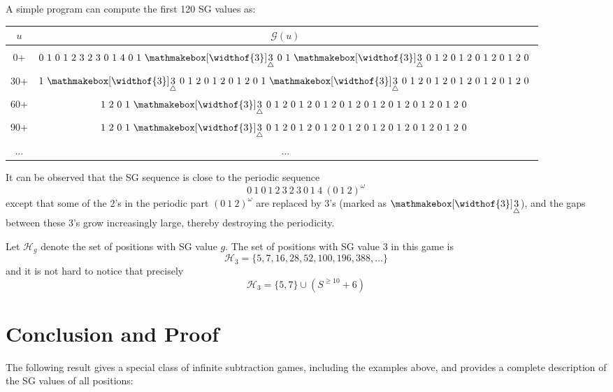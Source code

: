\documentclass[11pt]{article}
\theoremstyle{definition}
\theoremstyle{plain}
\newcommand{\E}{\mathmakebox[\widthof{3}]{\underset{\triangle}{3}}}
\begin{document}
A simple program can compute the first 120 SG values as:
\begin{center}
    \begin{tabular}{|c|c|}
        \hline
        $u$ & $\mathcal{G}(u)$ \\
        \hline
         & \\[-8pt]
        0+  & $0~ 1~ 0~ 1~ 2~ 3~ 2~ 3~ 0~ 1~ 4~ 0~ 1~\E~ 0~ 1~\E~ 0~ 1~ 2~ 0~ 1~ 2~ 0~ 1~ 2~ 0~ 1~ 2~ 0~$ \\[8pt]
        30+ & $1~\E~ 0~ 1~ 2~ 0~ 1~ 2~ 0~ 1~ 2~ 0~ 1~\E~ 0~ 1~ 2~ 0~ 1~ 2~ 0~ 1~ 2~ 0~ 1~ 2~ 0~ 1~ 2~ 0~$ \\[8pt]
        60+ & $1~ 2~ 0~ 1~\E~ 0~ 1~ 2~ 0~ 1~ 2~ 0~ 1~ 2~ 0~ 1~ 2~ 0~ 1~ 2~ 0~ 1~ 2~ 0~ 1~ 2~ 0~ 1~ 2~ 0~$ \\[8pt]
        90+ & $1~ 2~ 0~ 1~\E~ 0~ 1~ 2~ 0~ 1~ 2~ 0~ 1~ 2~ 0~ 1~ 2~ 0~ 1~ 2~ 0~ 1~ 2~ 0~ 1~ 2~ 0~ 1~ 2~ 0~$ \\[8pt]
        $\ldots$ & $\ldots$ \\
        \hline
    \end{tabular}
\end{center}

It can be observed that the SG sequence is close to the periodic sequence
\[
    0~ 1~ 0~ 1~ 2~ 3~ 2~ 3~ 0~ 1~ 4~ (0~ 1~ 2)^{\omega}
\]
except that some of the 2's in the periodic part $(0~1~2)^{\omega}$ are replaced by 3's (marked as $\E$),
and the gaps between these 3's grow increasingly large, thereby destroying the periodicity.

Let $\mathcal{H}_g$ denote the set of positions with SG value $g$.
The set of positions with SG value $3$ in this game is
\[
    \mathcal{H}_3 = \{5, 7, 16, 28, 52, 100, 196, 388,\ldots\}
\]
and it is not hard to notice that precisely
\[
    \mathcal{H}_3 = \{5, 7\} \cup (S^{\geq10}+6)
\]

\section{Conclusion and Proof}

The following result gives a special class of infinite subtraction games, including the examples above, and provides a complete description of the SG values of all positions:
\end{document}

